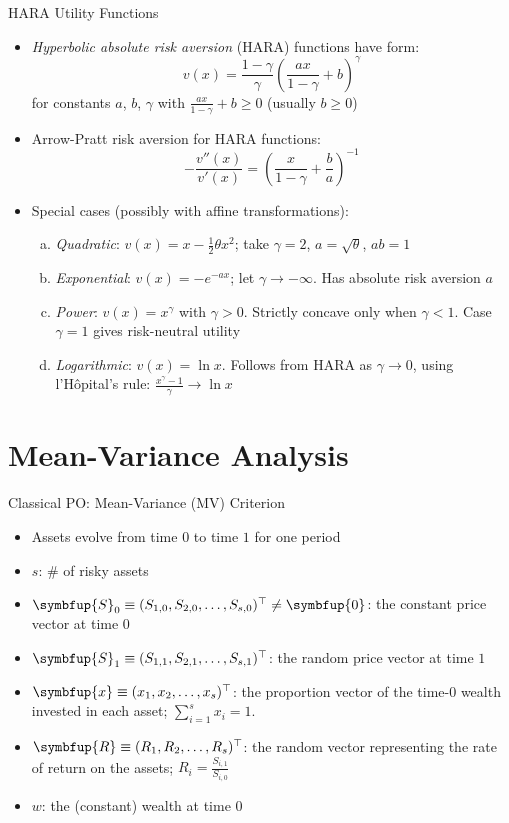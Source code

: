 \documentclass[10pt]{beamer}
\newcommand{\ds}{\displaystyle}
\newcommand{\vx}{\symbfup{x}}
\newcommand{\vS}{\symbfup{S}}
\newcommand{\vR}{\symbfup{R}}
\newcommand{\vZero}{\symbfup{0}}
\theoremstyle{definition}
\begin{document}
\begin{frame}{HARA Utility Functions}
  \begin{itemize}[<+->]
    \item \emph{Hyperbolic absolute risk aversion} (HARA) functions have form:
      \[v(x) = \frac{1-\gamma}{\gamma}\left(\frac{ax}{1-\gamma} + b\right)^\gamma\]
      for constants $a$, $b$, $\gamma$ with $\ds\frac{ax}{1-\gamma} + b \geqslant 0$ (usually $b \geqslant 0$)
    \item Arrow-Pratt risk aversion for HARA functions:
      \[-\frac{v''(x)}{v'(x)} = \left(\frac{x}{1-\gamma} + \frac{b}{a}\right)^{-1}\]
    \item Special cases (possibly with affine transformations):
      \begin{enumerate}[(a)]
        \item \emph{Quadratic}: $v(x) = x - \frac{1}{2}\theta x^2$; take $\gamma = 2$, $a = \sqrt{\theta}$, $ab = 1$
        \item \emph{Exponential}: $v(x) = -e^{-ax}$; let $\gamma \to -\infty$. Has absolute risk aversion $a$
        \item \emph{Power}: $v(x) = x^\gamma$ with $\gamma > 0$. Strictly concave only when $\gamma < 1$. Case $\gamma = 1$ gives risk-neutral utility
        \item \emph{Logarithmic}: $v(x) = \ln x$. Follows from HARA as $\gamma \to 0$, using l'Hôpital's rule: $\ds\frac{x^\gamma - 1}{\gamma} \to \ln x$
      \end{enumerate}
  \end{itemize}
\end{frame}

\section{Mean-Variance Analysis}

\begin{frame}{Classical PO: Mean-Variance (MV) Criterion}
  \begin{itemize}[<+->]
    \item Assets evolve from time $0$ to time $1$ for one period
    \item $s$: \# of risky assets 
    \item $\vS_0\equiv(S_{1, 0}, S_{2, 0}, \ldots, S_{s, 0})^\top\not=\vZero$: the constant price vector at time $0$
    \item $\vS_1\equiv(S_{1, 1}, S_{2, 1}, \ldots, S_{s, 1})^\top$: the random price vector at time $1$
    \item $\vx\equiv(x_1, x_2, \ldots, x_s)^\top$: the proportion vector of the time-$0$ wealth invested in each asset; $\ds\sum_{i=1}^s x_i = 1$.
    \item $\vR\equiv(R_1, R_2, \ldots, R_s)^\top$: the random vector representing the rate of return on the assets; $\ds R_i = \frac{S_{i, 1}}{S_{i, 0}}$
    \item $w$: the (constant) wealth at time $0$
  \end{itemize}
\end{frame}
\end{document}

